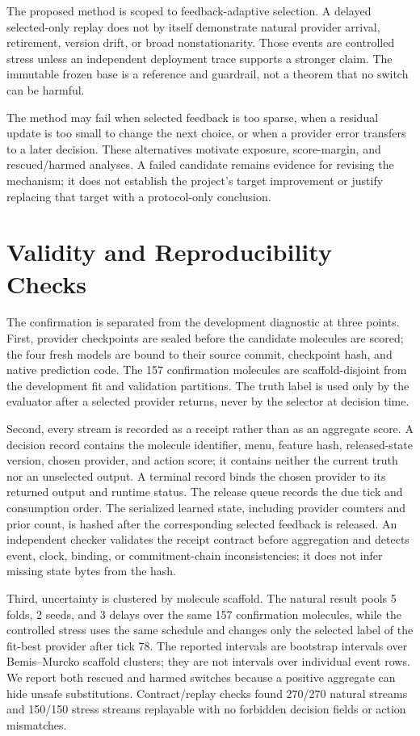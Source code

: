 \documentclass[sigconf,anonymous]{aamas}
\begin{document}
The proposed method is scoped to feedback-adaptive selection. A delayed selected-only replay does not by itself demonstrate natural provider arrival, retirement, version drift, or broad nonstationarity. Those events are controlled stress unless an independent deployment trace supports a stronger claim. The immutable frozen base is a reference and guardrail, not a theorem that no switch can be harmful.

The method may fail when selected feedback is too sparse, when a residual update is too small to change the next choice, or when a provider error transfers to a later decision. These alternatives motivate exposure, score-margin, and rescued/harmed analyses. A failed candidate remains evidence for revising the mechanism; it does not establish the project's target improvement or justify replacing that target with a protocol-only conclusion.

\section{Validity and Reproducibility Checks}
The confirmation is separated from the development diagnostic at three points. First, provider checkpoints are sealed before the candidate molecules are scored; the four fresh models are bound to their source commit, checkpoint hash, and native prediction code. The 157 confirmation molecules are scaffold-disjoint from the development fit and validation partitions. The truth label is used only by the evaluator after a selected provider returns, never by the selector at decision time.

Second, every stream is recorded as a receipt rather than as an aggregate score. A decision record contains the molecule identifier, menu, feature hash, released-state version, chosen provider, and action score; it contains neither the current truth nor an unselected output. A terminal record binds the chosen provider to its returned output and runtime status. The release queue records the due tick and consumption order. The serialized learned state, including provider counters and prior count, is hashed after the corresponding selected feedback is released. An independent checker validates the receipt contract before aggregation and detects event, clock, binding, or commitment-chain inconsistencies; it does not infer missing state bytes from the hash.

Third, uncertainty is clustered by molecule scaffold. The natural result pools 5 folds, 2 seeds, and 3 delays over the same 157 confirmation molecules, while the controlled stress uses the same schedule and changes only the selected label of the fit-best provider after tick 78. The reported intervals are bootstrap intervals over Bemis--Murcko scaffold clusters; they are not intervals over individual event rows. We report both rescued and harmed switches because a positive aggregate can hide unsafe substitutions. Contract/replay checks found 270/270 natural streams and 150/150 stress streams replayable with no forbidden decision fields or action mismatches.
\end{document}
